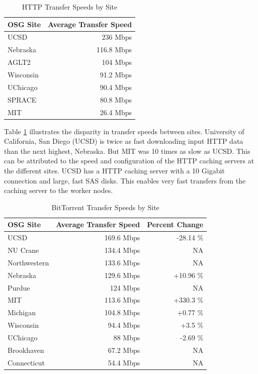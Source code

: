 \begin{table}[h!t]
	\centering
	\bgroup
	\def\arraystretch{1.5}
	\begin{tabular}{l|r}
\textbf{OSG Site} & \textbf{Average Transfer Speed} \\ \hline
UCSD & 236 Mbps \\ \hline
Nebraska & 116.8 Mbps \\ \hline
AGLT2 & 104 Mbps \\ \hline
Wisconsin & 91.2 Mbps \\ \hline
UChicago & 90.4 Mbps \\ \hline
SPRACE & 80.8 Mbps \\ \hline
MIT & 26.4 Mbps \\ \hline
	\end{tabular}
	\egroup
	\caption{HTTP Transfer Speeds by Site}
	\label{tbl:transferspeedsites}
\end{table}

Table \ref{tbl:transferspeedsites} illustrates the disparity in transfer speeds between sites.  University of California, San Diego (UCSD) is twice as fast downloading input HTTP data than the next highest, Nebraska.  But MIT was 10 times as slow as UCSD.  This can be attributed to the speed and configuration of the HTTP caching servers at the different sites.  UCSD has a HTTP caching server with a 10 Gigabit connection and large, fast SAS disks.  This enables very fast transfers from the caching server to the worker nodes.


\begin{table}[h!t]
\centering
\bgroup
\def\arraystretch{1.5}
\begin{tabular}{l|r|r}
	\textbf{OSG Site} & \textbf{Average Transfer Speed} & \textbf{Percent Change} \\ \hline
	UCSD & 169.6 Mbps & -28.14 \% \\ \hline
	NU Crane & 134.4 Mbps & NA \\ \hline
	Northwestern & 133.6 Mbps & NA \\ \hline
	Nebraska & 129.6 Mbps & +10.96 \% \\ \hline
	Purdue & 124 Mbps & NA \\ \hline
	MIT & 113.6 Mbps & +330.3 \% \\ \hline
	Michigan & 104.8 Mbps & +0.77 \% \\ \hline
	Wisconsin & 94.4 Mbps & +3.5 \% \\ \hline
	UChicago & 88 Mbps & -2.69 \% \\ \hline
	Brookhaven & 67.2 Mbps & NA \\ \hline
	Connecticut & 54.4 Mbps & NA \\ \hline
	
\end{tabular}
\egroup
\caption{BitTorrent Transfer Speeds by Site}
\label{tbl:bittorrenttransferspeedsites}
\end{table}



